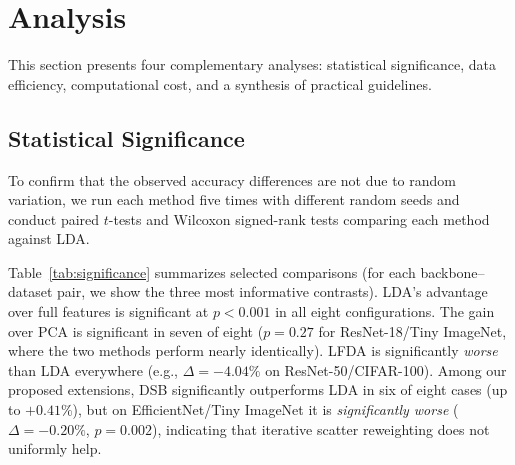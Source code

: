 \section{Analysis}
\label{sec:analysis}

This section presents four complementary analyses: statistical significance, data efficiency, computational cost, and a synthesis of practical guidelines.

\subsection{Statistical Significance}
\label{sec:significance}

To confirm that the observed accuracy differences are not due to random variation, we run each method five times with different random seeds and conduct paired $t$-tests and Wilcoxon signed-rank tests comparing each method against LDA.

Table~\ref{tab:significance} summarizes selected comparisons (for each backbone--dataset pair, we show the three most informative contrasts). LDA's advantage over full features is significant at $p < 0.001$ in all eight configurations. The gain over PCA is significant in seven of eight ($p = 0.27$ for ResNet-18/Tiny ImageNet, where the two methods perform nearly identically). LFDA is significantly \emph{worse} than LDA everywhere (e.g., $\Delta = -4.04\%$ on ResNet-50/CIFAR-100). Among our proposed extensions, DSB significantly outperforms LDA in six of eight cases (up to $+0.41\%$), but on EfficientNet/Tiny ImageNet it is \emph{significantly worse} ($\Delta = -0.20\%$, $p = 0.002$), indicating that iterative scatter reweighting does not uniformly help.

